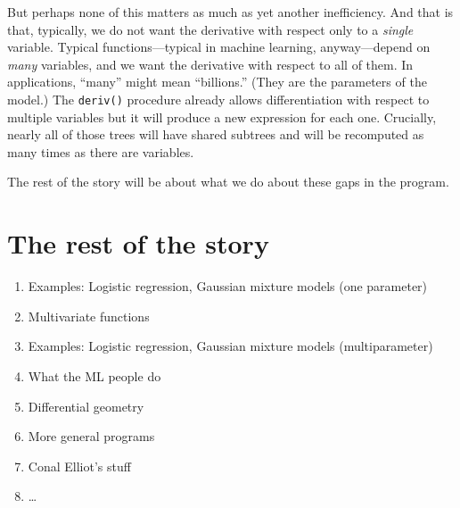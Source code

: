 \documentclass[11pt, a4paper]{article}
\newcommand{\cd}[1]{\texttt{#1}}
\begin{document}
But perhaps none of this matters as much as yet another
inefficiency. And that is that, typically, we do not want the
derivative with respect only to a \emph{single} variable. Typical
functions---typical in machine learning, anyway---depend on \emph{many}
variables, and we want the derivative with respect to all of them. In
applications, ``many'' might mean ``billions.'' (They are the
parameters of the model.) The \cd{deriv()} procedure already allows
differentiation with respect to multiple variables but it will produce
a new expression for each one. Crucially, nearly all of those trees
will have shared subtrees and will be recomputed as many times as
there are variables.

The rest of the story will be about what we do about these gaps in the
program.

\section{The rest of the story}

\begin{enumerate}
\item Examples: Logistic regression, Gaussian mixture models (one parameter)
\item Multivariate functions
\item Examples: Logistic regression, Gaussian mixture models (multiparameter)
\item What the ML people do 
\item Differential geometry
\item More general programs
\item Conal Elliot's stuff
\item \dots
\end{enumerate}
\end{document}
